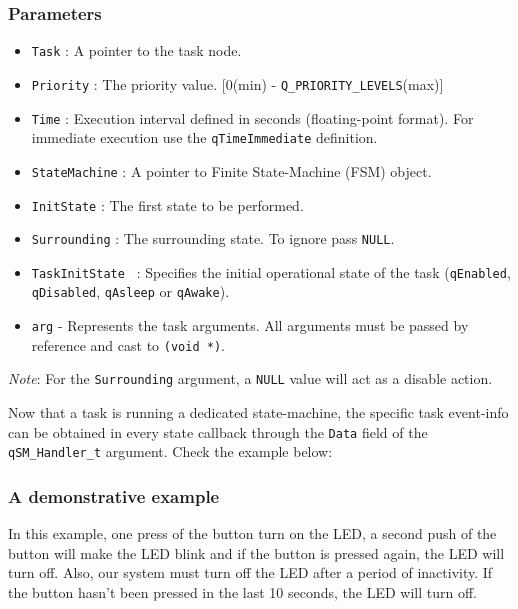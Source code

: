 \subsubsection*{Parameters}
\begin{itemize}
    \item \lstinline{Task} : A pointer to the task node. 
    \item \lstinline{Priority} : The priority value. [0(min) - \lstinline{Q_PRIORITY_LEVELS}(max)]
    \item \lstinline{Time} : Execution interval defined in seconds (floating-point format). For immediate execution use the  \lstinline{qTimeImmediate} definition. 
    \item \lstinline{StateMachine} : A pointer to Finite State-Machine (FSM) object.
    \item \lstinline{InitState} : The first state to be performed. 
    \item \lstinline{Surrounding} : The surrounding state. To ignore pass \lstinline{NULL}.   
    \item \lstinline{TaskInitState } : Specifies the initial operational state of the task (\lstinline{qEnabled}, \lstinline{qDisabled}, \lstinline{qAsleep} or \lstinline{qAwake}).
    \item \lstinline{arg} - Represents the task arguments. All arguments must be passed by reference and cast to \lstinline{(void *)}. 
\end{itemize}

\begin{tcolorbox}
\ArrowBoldDownRight \textit{Note}: For the \lstinline{Surrounding} argument, a \lstinline{NULL} value will act as a disable action.
\end{tcolorbox}

Now that a task is running a dedicated state-machine, the specific task event-info can be obtained in every state callback through the \lstinline{Data} field of the \lstinline{qSM_Handler_t} argument. Check the example below:
\medskip



\subsubsection{A demonstrative example} \label{fsm_example}
In this example, one press of the button turn on the LED, a second push of the button will make the LED blink and if the button is pressed again, the LED will turn off. Also, our system must turn off the LED after a period of inactivity. If the button hasn't been pressed in the last 10 seconds, the LED will turn off. 

